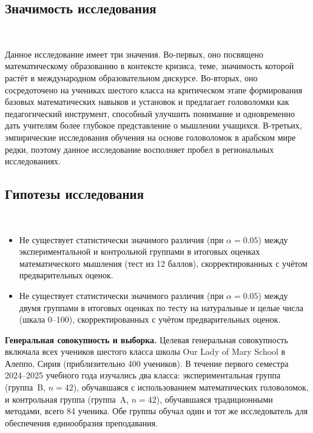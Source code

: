 \documentclass[a4paper,14pt]{extreport}
\theoremstyle{plain}
\theoremstyle{definition}
\theoremstyle{remark}
\begin{document}
\subsection*{Значимость исследования}~\label{sec4.3.2}

Данное исследование имеет три значения. Во-первых, оно посвящено математическому образованию в контексте кризиса, теме, значимость которой растёт в международном образовательном дискурсе. Во-вторых, оно сосредоточено на учениках шестого класса на критическом этапе формирования базовых математических навыков и установок и предлагает головоломки как педагогический инструмент, способный улучшить понимание и одновременно дать учителям более глубокое представление о мышлении учащихся. В-третьих, эмпирические исследования обучения на основе головоломок в арабском мире редки, поэтому данное исследование восполняет пробел в региональных исследованиях.

\subsection*{Гипотезы исследования}~\label{sec4.3.3}

\begin{itemize}
	\item[$H_{01}$:] Не существует статистически значимого различия (при $\alpha = 0.05$) между экспериментальной и контрольной группами в итоговых оценках математического мышления (тест из 12 баллов), скорректированных с учётом предварительных оценок.
	\item[$H_{02}$:] Не существует статистически значимого различия (при $\alpha = 0.05$) между двумя группами в итоговых оценках по тесту на натуральные и целые числа (шкала 0--100), скорректированных с учётом предварительных оценок.
\end{itemize}

\textbf{Генеральная совокупность и выборка.} Целевая генеральная совокупность включала всех учеников шестого класса школы Our Lady of Mary School в Алеппо, Сирия (приблизительно 400 учеников).
В течение первого семестра 2024--2025 учебного года изучались два класса: экспериментальная группа (группа~B, $n=42$), обучавшаяся с использованием математических головоломок, и контрольная группа (группа~A, $n=42$), обучавшаяся традиционными методами, всего 84 ученика. 
Обе группы обучал один и тот же исследователь для обеспечения единообразия преподавания.
\end{document}
